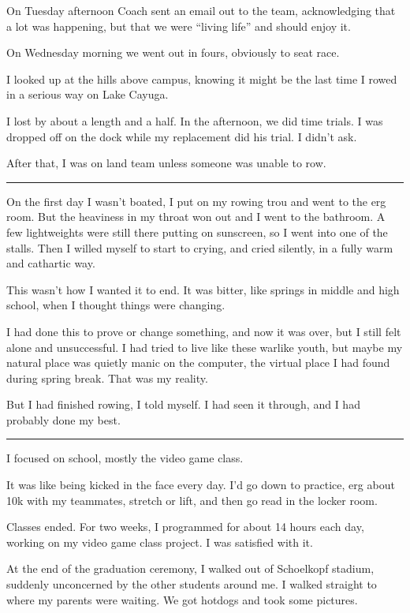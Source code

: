 On Tuesday afternoon Coach sent an email out to the team, acknowledging that a
lot was happening, but that we were ``living life'' and should enjoy it.

On Wednesday morning we went out in fours, obviously to seat race.

I looked up at the hills above campus, knowing it might be the last time I rowed
in a serious way on Lake Cayuga.  

I lost by about a length and a half.  In the afternoon, we did time trials.  I
was dropped off on the dock while my replacement did his trial.  I didn't ask.

After that, I was on land team unless someone was unable to row.
 
\plainfancybreak{12pt}{2}{* * *}

On the first day I wasn't boated, I put on my rowing trou and went to the erg
room.  But the heaviness in my throat won out and I went to the bathroom.  A few
lightweights were still there putting on sunscreen, so I went into one of the
stalls.  Then I willed myself to start to crying, and cried silently, in a fully
warm and cathartic way.  

This wasn't how I wanted it to end.  It was bitter, like springs in middle and
high school, when I thought things were changing.  

I had done this to prove or change something, and now it was over, but I still
felt alone and unsuccessful.  I had tried to live like these warlike youth, but
maybe my natural place was quietly manic on the computer, the virtual place I
had found during spring break.  That was my reality.

But I had finished rowing, I told myself.  I had seen it through, and I had
probably done my best.

\plainfancybreak{12pt}{2}{* * *}

I focused on school, mostly the video game class.

It was like being kicked in the face every day.  I'd go down to practice, erg
about 10k with my teammates, stretch or lift, and then go read in the locker
room.

Classes ended.  For two weeks, I programmed for about 14 hours each day, working
on my video game class project.  I was satisfied with it.

At the end of the graduation ceremony, I walked out of Schoelkopf stadium,
suddenly unconcerned by the other students around me.  I walked straight to
where my parents were waiting.  We got hotdogs and took some pictures.  

